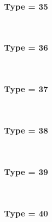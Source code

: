 \documentclass{article}
\begin{document}
            \\
        
        
        
            \subsubsection*{Type = 35}    
            
            \\
        
        
        
            \subsubsection*{Type = 36}    
            
            \\
        
        
        
            \subsubsection*{Type = 37}    
            
            \\
        
        
        
            \subsubsection*{Type = 38}    
            
            \\
        
        
        
            \subsubsection*{Type = 39}    
            
            \\
        
        
        
            \subsubsection*{Type = 40}    
            
            \\
        
\end{document}
